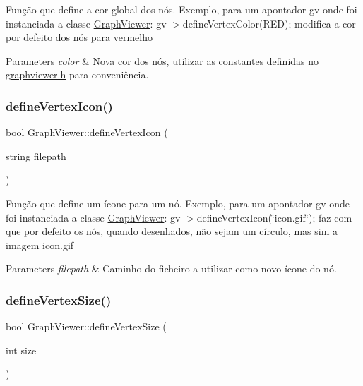 Função que define a cor global dos nós. Exemplo, para um apontador gv onde foi instanciada a classe \hyperlink{class_graph_viewer}{Graph\+Viewer}\+: gv-\/$>$define\+Vertex\+Color(\+R\+E\+D); modifica a cor por defeito dos nós para vermelho


\begin{DoxyParams}{Parameters}
{\em color} & Nova cor dos nós, utilizar as constantes definidas no \hyperlink{graphviewer_8h}{graphviewer.\+h} para conveniência. \\
\hline
\end{DoxyParams}
\hypertarget{class_graph_viewer_af1adb6a361457187a820e01dcf0a34b7}{}\label{class_graph_viewer_af1adb6a361457187a820e01dcf0a34b7} 
\subsubsection{\texorpdfstring{define\+Vertex\+Icon()}{defineVertexIcon()}}
{\footnotesize\ttfamily bool Graph\+Viewer\+::define\+Vertex\+Icon (\begin{DoxyParamCaption}\item[{string}]{filepath }\end{DoxyParamCaption})}

Função que define um ícone para um nó. Exemplo, para um apontador gv onde foi instanciada a classe \hyperlink{class_graph_viewer}{Graph\+Viewer}\+: gv-\/$>$define\+Vertex\+Icon(\char`\"{}icon.\+gif\char`\"{}); faz com que por defeito os nós, quando desenhados, não sejam um círculo, mas sim a imagem icon.\+gif


\begin{DoxyParams}{Parameters}
{\em filepath} & Caminho do ficheiro a utilizar como novo ícone do nó. \\
\hline
\end{DoxyParams}
\hypertarget{class_graph_viewer_ac4b2a9fec74d38e64088aa79ca4b7d9b}{}\label{class_graph_viewer_ac4b2a9fec74d38e64088aa79ca4b7d9b} 
\subsubsection{\texorpdfstring{define\+Vertex\+Size()}{defineVertexSize()}}
{\footnotesize\ttfamily bool Graph\+Viewer\+::define\+Vertex\+Size (\begin{DoxyParamCaption}\item[{int}]{size }\end{DoxyParamCaption})}

